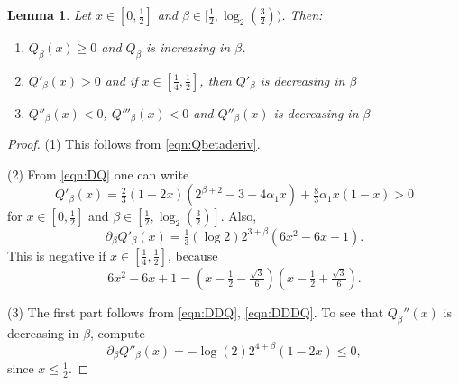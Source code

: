 \documentclass[12pt]{amsart}
\theoremstyle{plain}
\newtheorem{lem}[thm]{Lemma}
\theoremstyle{definition}
\theoremstyle{remark}
\numberwithin{equation}{section}
\begin{document}
\begin{lem}\label{lem:Qbprop}
Let $x\in [0,\tfrac12]$ and  $\beta\in[\frac12,\log_2(\frac32))$. Then:
\begin{enumerate}
\item $Q_\beta(x)\ge 0$ and $Q_\beta$ is increasing in $\beta$.
\item $Q'_\beta(x)> 0$ and if $x\in[\frac14,\frac12]$, then $Q'_\beta$ is decreasing in $\beta$
\item $Q''_\beta(x)<0$, $Q'''_\beta(x)<0$ and $Q''_\beta(x)$ is decreasing in $\beta$
\end{enumerate}
\end{lem}

\begin{proof}
    (1) This follows from \eqref{eqn:Qbetaderiv}.
    
    (2) From \eqref{eqn:DQ} one can write
    \[Q'_\beta(x)= \tfrac{2}{3}(1-2x)(2^{\beta+2}-3+4\alpha_1 x) + \tfrac{8}{3}\alpha_1 x(1-x)>0 \]
for $x\in [0,\frac12]$ and $\beta\in[\frac12,\log_2(\frac32)]$.
    Also,
    \[\partial_\beta Q'_\beta(x) = \tfrac{1}{3}(\log 2)2^{3+\beta}(6x^2-6x+1). \]
This is negative if $x\in [\tfrac{1}{4},\tfrac{1}{2}]$, because
\[ 6x^2-6x+1=(x-\tfrac{1}{2}-\tfrac{\sqrt{3}}{6}) (x-\tfrac{1}{2}+\tfrac{\sqrt{3}}{6}).\]

    (3)  The first part follows from \eqref{eqn:DDQ}, \eqref{eqn:DDDQ}. To see that $Q_\beta''(x)$ is decreasing in $\beta$, compute    \[\partial_\beta Q''_\beta(x) = -\log(2)2^{4+\beta}(1-2x)\le 0, \]
    since $x\leq \tfrac{1}{2}$. 
\end{proof}
\end{document}
